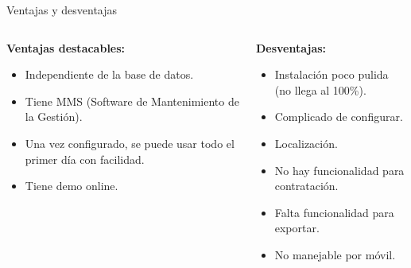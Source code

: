 \begin{frame}{Ventajas y desventajas}
	\begin{columns}[T]
		\begin{column}{.5\textwidth}
			\textbf{Ventajas destacables:}
			\begin{itemize}
				\item Independiente de la base de datos.
				\item Tiene MMS (Software de Mantenimiento de la Gestión).
				\item Una vez configurado, se puede usar todo el primer día con facilidad.
				\item Tiene demo online.
			\end{itemize}
		\end{column}
		
		\begin{column}{.5\textwidth}
			\textbf{Desventajas:}
			\begin{itemize}
				\item Instalación poco pulida (no llega al 100\%).
				\item Complicado de configurar.
				\item Localización.
				\item No hay funcionalidad para contratación.
				\item Falta funcionalidad para exportar.
				\item No manejable por móvil.
			\end{itemize}
		\end{column}
	\end{columns}
\end{frame}

